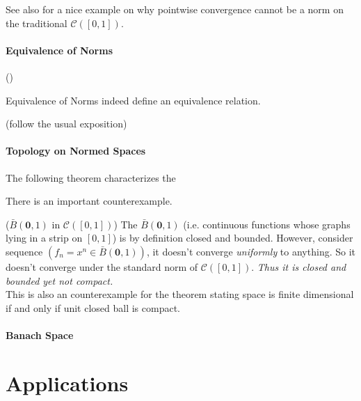 \documentclass[10pt]{article}
\begin{document}
See also \cite[Example 1.3.8]{intro-hilbert} for a nice example on why pointwise convergence cannot be a norm on the traditional $\mathcal{C}([0,1])$.

\subsection{Equivalence of Norms}

\begin{definition} (\cite[Definition 1.3.9]{intro-hilbert})

\end{definition}

Equivalence of Norms indeed define an equivalence relation.

(follow the usual exposition)

\subsection{Topology on Normed Spaces}

The following theorem characterizes the

There is an important counterexample.
\begin{example}($\bar B(\mathbf{0}, 1)$ in $\mathcal{C}([0,1])$)
  The $\bar B(\mathbf{0}, 1)$ (i.e. continuous functions whose graphs lying in a strip on $[0,1]$) is by definition closed and bounded. However, consider sequence $(f_n = x^n \in \bar B(\mathbf{0}, 1))$, it doesn't converge \textit{uniformly} to anything. So it doesn't converge under the standard norm of $\mathcal{C}([0,1])$. \textit{Thus it is closed and bounded yet not compact.}\\

  This is also an counterexample for the theorem stating space is finite dimensional if and only if unit closed ball is compact.
\end{example}


\subsection{Banach Space}


\newpage

\part{Applications}

\newpage


\end{document}
